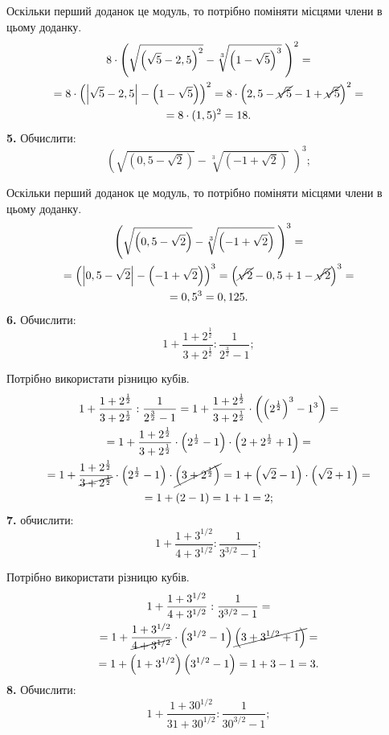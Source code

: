 Оскільки \hfill перший \hfill доданок \hfill це \hfill модуль, \hfill то \hfill потрібно \hfill поміняти \break
місцями члени в цьому доданку.
\begin{multline*}
8 \cdot \left(\sqrt{\left(\sqrt{5} - 2,5\right)^2} - \sqrt[3]{\left(1 - \sqrt{5}\right)^3}\;\right)^2 =\\
= 8 \cdot \left(\left|\sqrt{5} - 2,5\right| - \left(1 - \sqrt{5}\right)\right)^2 =
8 \cdot \left(2,5 - \cancel{\sqrt{5}} - 1 + \cancel{\sqrt{5}}\right)^2 =\\
= 8 \cdot (1,5)^2 = 18.
\end{multline*}
\textbf{5.} Обчислити:
$$
\left(\sqrt{\left(0,5 - \sqrt{2}\right)} - \sqrt[3]{\left(-1 + \sqrt{2}\right)}\;\right)^3;
$$

Оскільки \hfill перший \hfill доданок \hfill це \hfill модуль, \hfill то \hfill потрібно \hfill поміняти \break
місцями члени в цьому доданку.
\begin{multline*}
\left(\sqrt{\left(0,5 - \sqrt{2}\right)} - \sqrt[3]{\left(-1 + \sqrt{2}\right)}\;\right)^3 =\\
= \left(\left|0,5 - \sqrt{2}\right| - \left(-1 + \sqrt{2}\right)\right)^3 =
\left(\cancel{\sqrt{2}} - 0,5 +1 - \cancel{\sqrt{2}}\right)^3 =\\
= 0,5^3 = 0,125.
\end{multline*}
\textbf{6.} Обчислити:
$$
1 + \frac{1 + 2^\frac{1}{2}}{3 + 2^\frac{1}{2}} : \frac{1}{2^\frac{3}{2} - 1};
$$

Потрібно використати різницю кубів.
\begin{multline*}
1 + \frac{1 + 2^\frac{1}{2}}{3 + 2^\frac{1}{2}} : \frac{1}{2^\frac{3}{2} - 1} = 
1 + \frac{1 + 2^\frac{1}{2}}{3 + 2^\frac{1}{2}} \cdot \left(\left(2^\frac{1}{2}\right)^3 - 1^3\right) =\\
= 1 + \frac{1 + 2^\frac{1}{2}}{3 + 2^\frac{1}{2}} \cdot \left(2^\frac{1}{2} - 1\right) \cdot \left(2 + 2^\frac{1}{2} + 1\right) =\\
= 1 + \frac{1 + 2^\frac{1}{2}}{\cancel{3 + 2^\frac{1}{2}}} \cdot \left(2^\frac{1}{2} - 1\right) \cdot \cancel{\left(3 + 2^\frac{1}{2}\right)} =
1 + \left(\sqrt{2} - 1\right) \cdot \left(\sqrt{2} + 1\right) =\\
= 1 + (2 - 1) = 1 + 1 = 2;
\end{multline*}
\textbf{7.} обчислити:
$$
1 + \frac{1 + 3^{1/2}}{4 + 3^{1/2}} : \frac{1}{3^{3/2} - 1};
$$

Потрібно використати різницю кубів.
\begin{multline*}
1 + \frac{1 + 3^{1/2}}{4 + 3^{1/2}} : \frac{1}{3^{3/2} - 1} =\\
= 1 + \frac{1 + 3^{1/2}}{\cancel{4 + 3^{1/2}}} \cdot \left(3^{1/2} - 1\right) \cancel{\left(3 + 3^{1/2} + 1\right)} =\\
= 1 + \left(1 + 3^{1/2}\right)\left(3^{1/2} - 1\right) = 1 + 3 - 1 = 3.
\end{multline*}
\textbf{8.} Обчислити:
$$
1 + \frac{1 + 30^{1/2}}{31 + 30^{1/2}} : \frac{1}{30^{3/2} - 1};
$$

